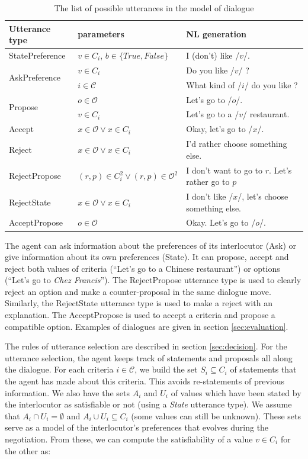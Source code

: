 \documentclass{llncs}
\begin{document}
		\begin{table}[h]
			\begin{tabular} {|p{2.5cm}|p{3.5cm}|p{6cm}|}
				\hline
				Utterance type & parameters & NL generation\\
				\hline
				StatePreference & $v \in C_i$, $b\in\{True,False\}$ & I (don't) like /$v$/.\\
				\hline
				 \multirow{2}{*}{AskPreference} &$v \in C_i$ & Do you like /$v$/ ?\\
				 \cline{2-3} & $i\in\mathcal{C}$ & What kind of /$i$/ do you like ?\\
				 \hline
				 \multirow{2}{*}{Propose} & $o \in \mathcal{O}$ & Let's go to /$o$/.\\
				 \cline{2-3} & $v \in C_i$ & Let's go to a /$v$/ restaurant.\\
				 \hline
				 Accept& $x \in \mathcal{O} \vee x\in C_i$ & Okay, let's go to /$x$/.\\
				 \hline
				 Reject & $x \in \mathcal{O} \vee x\in C_i$ & I'd rather choose  something else. \\
				 \hline
				 \hline
				 RejectPropose & $(r,p)\in C_i^2 \vee (r,p) \in \mathcal{O}^2 $ & I don't want to go to $r$. Let's rather go to $p$ \\
				 \hline 
				 RejectState & $x \in \mathcal{O} \vee x\in C_i$ &  I don't like /$x$/, let's choose something else. \\
				 \hline
				 AcceptPropose & $o \in \mathcal{O}$ & Okay. Let's go to /$o$/.\\
				 \hline
			\end{tabular}
			\caption{The list of possible utterances in the model of dialogue}
		\end{table}
	
	The agent can ask information about the preferences of its interlocutor (Ask) or give information about its own preferences (State). It can propose, accept and reject both values of criteria (``Let's go to a Chinese restaurant'') or options (``Let's go to \emph{Chez Francis}''). The RejectPropose utterance type is used to clearly reject an option and make a counter-proposal in the same dialogue move. Similarly, the RejectState utterance type is used to make a reject with an explanation. The AcceptPropose is used to accept a criteria and propose a compatible option. Examples of dialogues are given in section \ref{sec:evaluation}.
	
	\medskip
	The rules of utterance selection are described in section \ref{sec:decision}. For the utterance selection, the agent keeps track of statements and proposals all along the dialogue. For each criteria $i\in\mathcal{C}$, we build the set $S_i \subseteq C_i$ of statements that the agent has made about this criteria. This avoids re-statements of previous information. We also have the sets $A_i$ and $U_i$ of values which have been stated by the interlocutor as satisfiable or not (using a \emph{State} utterance type). We assume that $A_i\cap U_i=\emptyset$ and $A_i\cup U_i\subseteq C_i$ (some values can still be unknown). These sets serve as a model of the interlocutor's preferences that evolves during the negotiation. From these, we can compute the satisfiability of a value $v\in C_i$ for the other as:
	
\end{document}
